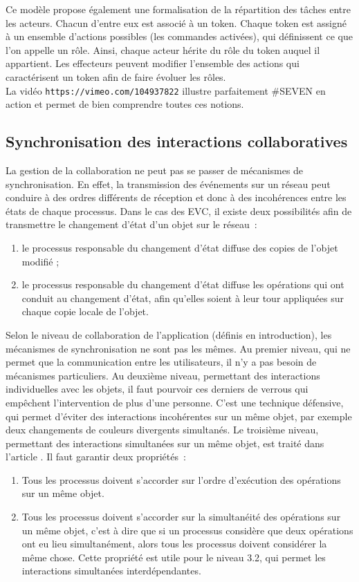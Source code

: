 \documentclass[11pt]{article}
\begin{document}
Ce modèle propose également une formalisation de la répartition des tâches entre les acteurs. Chacun d'entre eux est associé à un token. Chaque token est assigné à un ensemble d'actions possibles (les commandes activées), qui définissent ce que l'on appelle un rôle. Ainsi, chaque acteur hérite du rôle du token auquel il appartient. Les effecteurs peuvent modifier l'ensemble des actions qui caractérisent un token afin de faire évoluer les rôles.
\\

La vidéo \texttt{https://vimeo.com/104937822} illustre parfaitement \#SEVEN en action et permet de bien comprendre toutes ces notions.

\subsection{Synchronisation des interactions collaboratives}

La gestion de la collaboration ne peut pas se passer de mécanismes de synchronisation. En effet, la transmission des événements sur un réseau peut conduire à des ordres différents de réception et donc à des incohérences entre les états de chaque processus. Dans le cas des EVC, il existe deux possibilités afin de transmettre le changement d'état d'un objet sur le réseau~:
\begin{enumerate}
	\item le processus responsable du changement d'état diffuse des copies de l'objet modifié ;
	\item le processus responsable du changement d'état diffuse les opérations qui ont conduit au changement d'état, afin qu'elles soient à leur tour appliquées sur chaque copie locale de l'objet.
\end{enumerate}

Selon le niveau de collaboration de l'application (définis en introduction), les mécanismes de synchronisation ne sont pas les mêmes. Au premier niveau, qui ne permet que la communication entre les utilisateurs, il n'y a pas besoin de mécanismes particuliers. Au deuxième niveau, permettant des interactions individuelles avec les objets, il faut pourvoir ces derniers de verrous qui empêchent l'intervention de plus d'une personne. C'est une technique défensive, qui permet d'éviter des interactions incohérentes sur un même objet, par exemple deux changements de couleurs divergents simultanés. Le troisième niveau, permettant des interactions simultanées sur un même objet, est traité dans l'article \cite{margery}. Il faut garantir deux propriétés~:
\begin{enumerate}
	\item Tous les processus doivent s'accorder sur l'ordre d'exécution des opérations sur un même objet.
	\item Tous les processus doivent s'accorder sur la simultanéité des opérations sur un même objet, c'est à dire que si un processus considère que deux opérations ont eu lieu simultanément, alors tous les processus doivent considérer la même chose. Cette propriété est utile pour le niveau 3.2, qui permet les interactions simultanées interdépendantes.
\end{enumerate}
\end{document}
